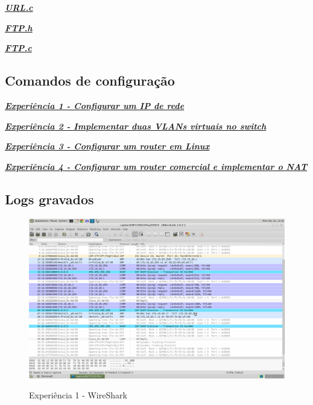 \documentclass[a4paper]{article}
\begin{document}
\begin{changemargin}{-3cm}{-4cm}
{\small}
\end{changemargin}

{\underline{\textit{\textbf{URL.c}}}}

\begin{changemargin}{-3cm}{-4cm}
{\small}
\end{changemargin}

{\underline{\textit{\textbf{FTP.h}}}}

\begin{changemargin}{-3cm}{-4cm}

\end{changemargin}

{\underline{\textit{\textbf{FTP.c}}}}

\begin{changemargin}{-3cm}{-4cm}
{\small}
\end{changemargin}

\pagebreak

\subsection{Comandos de configuração}
{\underline{\textit{\textbf{Experiência 1 - Configurar um IP de rede}}}}
\obeylines


\hfill

{\underline{\textit{\textbf{Experiência 2 - Implementar duas VLANs virtuais no switch}}}}
\obeylines


\hfill

{\underline{\textit{\textbf{Experiência 3 - Configurar um router em Linux}}}}
\obeylines


\hfill

{\underline{\textit{\textbf{Experiência 4 - Configurar um router comercial e implementar o NAT}}}}
\obeylines


\pagebreak

\subsection{Logs gravados}
\begin{figure}[h!]
\caption{Experiência 1 - WireShark}
\includegraphics[scale=0.25]{res/image2.png}
\label{fig:teste}
\end{figure}
\end{document}

